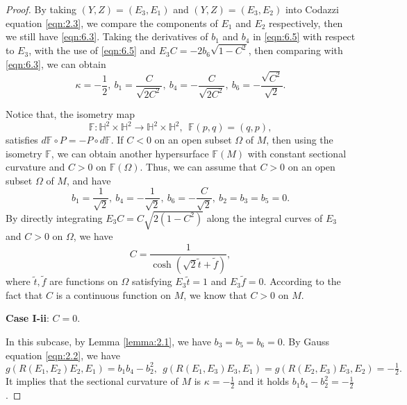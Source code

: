 \documentclass[reqno]{amsart}%
\theoremstyle{definition}
\numberwithin{equation}{section}
\begin{document}
\begin{proof}
By taking $(Y,Z)=(E_3,E_1)$ and $(Y,Z)=(E_3,E_2)$ into Codazzi equation \eqref{eqn:2.3},
we compare the components of $E_1$ and $E_2$ respectively, then we still have \eqref{eqn:6.3}.
Taking the derivatives of $b_1$ and $b_4$ in \eqref{eqn:6.5} with respect to $E_3$,
with the use of \eqref{eqn:6.5} and $E_3C=-2b_6\sqrt{1-C^2}$, then comparing with \eqref{eqn:6.3}, we can obtain
$$
\kappa=-\frac{1}{2},\ b_1=\frac{C}{\sqrt{2C^2}},\ b_4=-\frac{C}{\sqrt{2C^2}},\ b_6=-\frac{\sqrt{C^2}}{\sqrt{2}}.
$$

Notice that, the isometry map
$$
\mathbb{F}:\mathbb{H}^2\times \mathbb{H}^2\rightarrow\mathbb{H}^2\times \mathbb{H}^2,\ \
\mathbb{F}(p,q)=(q,p),
$$
satisfies $d \mathbb{F}\circ P=-P \circ d \mathbb{F}$. If $C<0$ on an open subset $\Omega$ of $M$, then using the isometry $\mathbb{F}$, we can obtain another hypersurface $\mathbb{F}(M)$ with constant sectional curvature and $C>0$ on $\mathbb{F}(\Omega)$. 
Thus, we can assume that $C>0$ on an open subset $\Omega$ of $M$, and have
$$
b_1=\frac{1}{\sqrt{2}},\ b_4=-\frac{1}{\sqrt{2}},\ b_6=-\frac{C}{\sqrt{2}},\ b_2=b_3=b_5=0.
$$
By directly integrating $E_3C=C\sqrt{2(1-C^2)}$ along the integral curves of $E_3$ and $C>0$ on $\Omega$, we have
$$
C=\frac{1}{\cosh(\sqrt{2}\tilde{t}+\tilde{f})},
$$
where $\tilde{t},\tilde{f}$ are functions on $\Omega$ satisfying $E_3\tilde{t}=1$ and $E_3\tilde{f}=0$.
According to the fact that $C$ is a continuous function on $M$, we know that $C>0$ on $M$. 


{\bf Case I-ii}: $C=0$.

In this subcase, by Lemma \ref{lemma:2.1}, we have $b_3=b_5=b_6=0$.
By Gauss equation \eqref{eqn:2.2}, we have
$$
g(R(E_1,E_2)E_2,E_1)=b_1b_4-b_2^2, \ \ g(R(E_1,E_3)E_3,E_1)=g(R(E_2,E_3)E_3,E_2)=-\tfrac{1}{2}.
$$
It implies that the sectional curvature of $M$ is $\kappa=-\tfrac{1}{2}$
and it holds $b_1b_4-b_2^2=-\tfrac{1}{2}$.


\end{proof}
\end{document}

